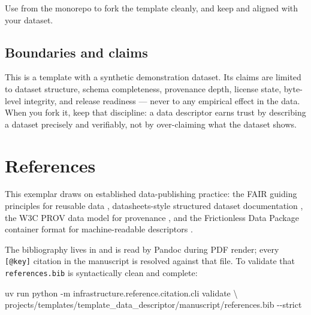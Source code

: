 \documentclass[
]{article}
\newenvironment{Shaded}{}{}
\newcommand{\AttributeTok}[1]{\textcolor[rgb]{0.49,0.56,0.16}{#1}}
\newcommand{\DataTypeTok}[1]{\textcolor[rgb]{0.56,0.13,0.00}{#1}}
\newcommand{\ExtensionTok}[1]{#1}
\newcommand{\NormalTok}[1]{#1}
\begin{document}
Use  from the monorepo to fork
the template cleanly, and keep  and
 aligned with your dataset.

\subsection{Boundaries and claims}\label{boundaries-and-claims}

This is a template with a synthetic demonstration dataset. Its claims
are limited to dataset structure, schema completeness, provenance depth,
license state, byte-level integrity, and release readiness --- never to
any empirical effect in the data. When you fork it, keep that
discipline: a data descriptor earns trust by describing a dataset
precisely and verifiably, not by over-claiming what the dataset shows.

\newpage

\section{References}\label{sec:references}

This exemplar draws on established data-publishing practice: the FAIR
guiding principles for reusable data \citep{wilkinson2016fair},
datasheets-style structured dataset documentation
\citep{gebru2021datasheets}, the W3C PROV data model for provenance
\citep{moreau2013prov}, and the Frictionless Data Package container
format for machine-readable descriptors
\citep{frictionless2023datapackage}.

The bibliography lives in
\href{references.bib}{} and is read by
Pandoc during PDF render; every \texttt{{[}@key{]}} citation in the
manuscript is resolved against that file. To validate that
\texttt{references.bib} is syntactically clean and complete:

\begin{Shaded}
\begin{Highlighting}[]
\ExtensionTok{uv}\NormalTok{ run python }\AttributeTok{{-}m}\NormalTok{ infrastructure.reference.citation.cli validate }\DataTypeTok{\textbackslash{}}
\NormalTok{    projects/templates/template\_data\_descriptor/manuscript/references.bib }\AttributeTok{{-}{-}strict}
\end{Highlighting}
\end{Shaded}




\clearpage


\end{document}
